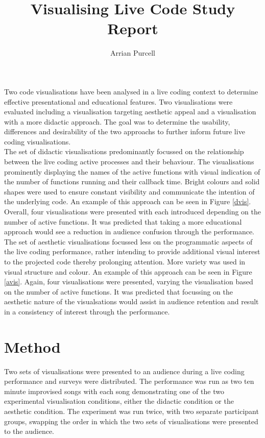 \documentclass[12pt]{article}
\begin{document}
\title{Visualising Live Code Study Report}
\author{Arrian Purcell}

\maketitle

Two code visualisations have been analysed in a live coding context to determine effective presentational and educational features. Two visualisations were evaluated including a visualisation targeting aesthetic appeal and a visualisation with a more didactic approach. The goal was to determine the usability, differences and desirability of the two approachs to further inform future live coding visualisations.\\

The set of didactic visualisations predominantly focussed on the relationship between the live coding active processes and their behaviour. The visualisations prominently displaying the names of the active functions with visual indication of the number of functions running and their callback time. Bright colours and solid shapes were used to ensure constant visibility and communicate the intention of the underlying code. An example of this approach can be seen in Figure \ref{dvis}. Overall, four visualisations were presented with each introduced depending on the number of active functions. It was predicted that taking a more educational approach would see a reduction in audience confusion through the performance.\\

The set of aesthetic visualisations focussed less on the programmatic aspects of the live coding performance, rather intending to provide additional visual interest to the projected code thereby prolonging attention. More variety was used in visual structure and colour. An example of this approach can be seen in Figure \ref{avis}. Again, four visualisations were presented, varying the visualisation based on the number of active functions. It was predicted that focussing on the aesthetic nature of the visualsations would assist in audience retention and result in a consistency of interest through the performance.

\section{Method}

Two sets of visualisations were presented to an audience during a live coding performance and surveys were distributed. The performance was run as two ten minute improvised songs with each song demonstrating one of the two experimental visualisation conditions, either the didactic condition or the aesthetic condition. The experiment was run twice, with two separate participant groups, swapping the order in which the two sets of visualisations were presented to the audience.\\
\end{document}
